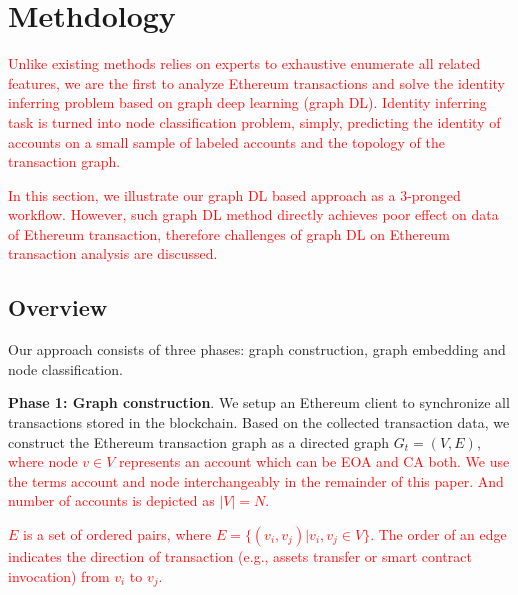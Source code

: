 
\section{Methdology}
\label{sec:graph_analysis}
\textcolor{red}{Unlike existing methods relies on experts to exhaustive enumerate all related features, we are the first to analyze Ethereum transactions and solve the identity inferring problem based on graph deep learning (graph DL). Identity inferring task is turned into node classification problem, simply, predicting the identity of accounts on a small sample of labeled accounts and the topology of the transaction graph.}


\textcolor{red}{In this section, we illustrate our graph DL based approach as a 3-pronged workflow. However, such graph DL method directly achieves poor effect on data of Ethereum transaction, therefore challenges of graph DL on Ethereum transaction analysis are discussed.} 



\subsection{Overview}
\label{subsec:methodology}
Our approach consists of three phases: graph construction, graph embedding and node classification.

\textbf{Phase 1: Graph construction}. We setup an Ethereum client to synchronize all transactions stored in the blockchain. Based on the collected transaction data, we construct the Ethereum transaction graph as a directed graph $G_{t}=(V,E)$, \textcolor{red}{where node $v \in V$ represents an account which can be EOA and CA both. We use the terms account and node interchangeably in the remainder of this paper. And number of accounts is depicted as $|V|=N$.}

\textcolor{red}{$E$ is a set of ordered pairs, where $E=\{(v_i,v_j)|v_i,v_j \in V\}$. The order of an edge indicates the direction of transaction (e.g., assets transfer or smart contract invocation) from $v_i$ to $v_j$.} %


